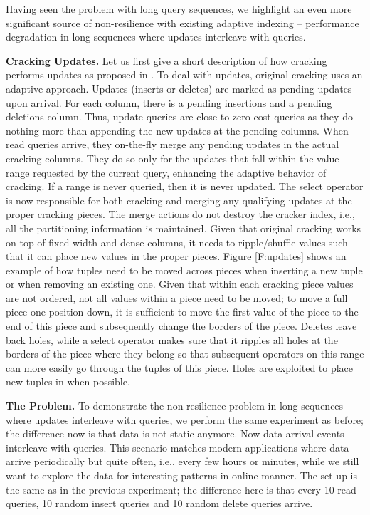 Having seen the problem with long query sequences, we highlight 
an even more significant source of non-resilience
with existing adaptive indexing -- performance degradation in long sequences where 
updates interleave with queries.

\textbf{Cracking Updates.}
Let us first give a short description of how cracking performs updates as  proposed in \cite{IKM:SIGMOD07}.
To deal with updates, original cracking uses an adaptive approach. Updates (inserts or deletes)
are marked as pending updates upon arrival. For each column, there is a pending insertions and a pending deletions column.
Thus, update queries are  close to zero-cost queries as they do nothing more than appending the new updates at
the pending columns.
When read queries arrive, they on-the-fly merge any pending updates in the actual cracking columns.
They do so only for the updates that fall within the value range requested by the current query, enhancing the adaptive
behavior of cracking. If a range is never queried, then it is never updated.
The select operator is now responsible for both cracking and merging any qualifying updates at the proper cracking
pieces.
The merge actions do not destroy the cracker index, i.e., all the partitioning information is maintained.
Given that original cracking works on top of fixed-width and dense columns, it needs to ripple/shuffle values 
such that it can place new values in the proper pieces.
Figure \ref{F:updates} shows an example of how tuples need to be moved across pieces when inserting 
a new tuple or when removing an existing one.
Given that within each cracking piece values are not ordered, not all values within a piece need to be moved;
to move a full piece one position down, it is sufficient to move the first value of the piece to the end of this piece
and subsequently change the borders of the piece.
Deletes leave back holes, while a select operator makes sure that it ripples all holes at the borders of the piece
where they belong so that subsequent operators on this range can more easily go through the tuples of this piece. 
Holes are exploited to place new tuples in when possible.


\textbf{The Problem.}
To demonstrate the non-resilience problem in long sequences where
updates interleave with queries, 
we perform the same experiment as before; the difference now is that data is not static anymore.
Now data arrival events interleave with queries.
This scenario matches modern applications where data arrive periodically  but quite often, i.e., 
every few hours or minutes, while we still want to explore the data for interesting patterns in online manner.
The set-up is the same as in the previous experiment;
the difference here is that every  10 read queries, 10 random insert queries and 10 random delete queries arrive.

